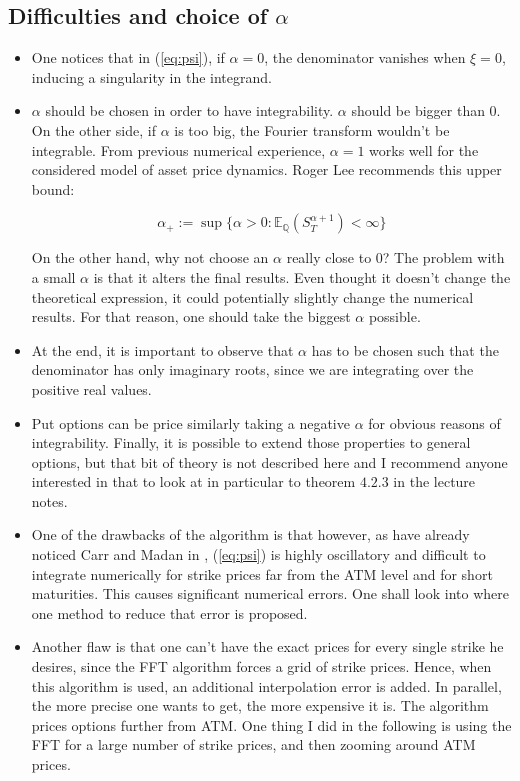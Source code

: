 \subsection{Difficulties and choice of $\alpha$}
\begin{itemize}


\item One notices that in (\ref{eq:psi}), if $\alpha = 0$, the denominator vanishes when $ \xi =0$, inducing a singularity in the integrand.

\item $\alpha$ should be chosen in order to have integrability. $\alpha$ should be bigger than $0$. On the other side, if $\alpha$ is too big, the Fourier transform wouldn't be integrable. From previous numerical experience,  $\alpha = 1$ works well for the considered model of asset price dynamics. Roger Lee recommends \cite{roger_lee} this upper bound: 

$$ \alpha_+ := \sup \{ \alpha  > 0 : \mathbb E_{\mathbb Q} ( S_T^{\alpha + 1} )  < \infty  \} $$ 

On the other hand, why not choose an $\alpha$ really close to 0? The problem with a small $\alpha$ is that it alters the final results. Even thought it doesn't change the theoretical expression, it could potentially slightly change the numerical results. For that reason, one should take the biggest $\alpha$ possible.

\item At the end, it is important to observe that $\alpha$ has to be chosen such that the denominator has only imaginary roots, since we are integrating over the positive real values. 


\item Put options can be price similarly taking a negative $\alpha$ for obvious reasons of integrability. Finally, it is possible to extend those properties to general options, but that bit of theory is not described here and I recommend anyone interested in that to look at \cite{num_methods} in particular to theorem $4.2.3$ in the lecture notes.


\item One of the drawbacks of the algorithm is that however, as have already noticed Carr and Madan in \cite{CarrMadan}, (\ref{eq:psi}) is highly oscillatory and difficult to integrate numerically for strike prices far from the ATM level and for short maturities. This causes significant numerical errors. One shall look into \cite{fft_improve} where one method to reduce that error is proposed.

\item Another flaw is that one can't have the exact prices for every single strike he desires, since the FFT algorithm forces a grid of strike prices. Hence, when this algorithm is used, an additional interpolation error is added. In parallel, the more precise one wants to get, the more expensive it is. The algorithm prices options further from ATM. One thing I did in the following is using the FFT for a large number of strike prices, and then zooming around ATM prices.

\end{itemize}



